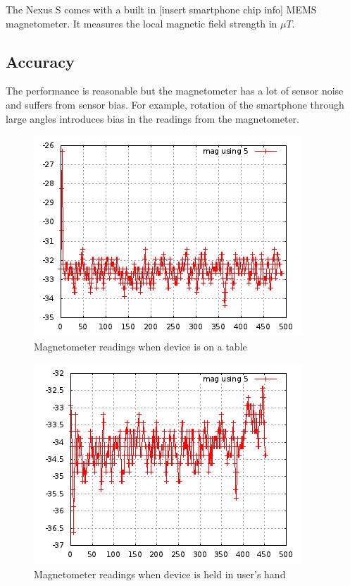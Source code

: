 The Nexus S comes with a built in [insert smartphone chip info] MEMS magnetometer.
It measures the local magnetic field strength in $\mu T$.

\subsection{Accuracy}
The performance is reasonable but the magnetometer has a lot of sensor noise and suffers from
sensor bias. For example, rotation of the smartphone through large angles introduces bias
in the readings from the magnetometer.

\begin{figure}\centering
    \includegraphics{figures/mag_z_table.png}
    \caption{Magnetometer readings when device is on a table \label{fig:mag_z_table}}
\end{figure}

\begin{figure}\centering
    \includegraphics{figures/mag_z_handheld_standing.png}
    \caption{Magnetometer readings when device is held in user's hand\label{fig:mag_z_handheld_standing}}
\end{figure}

